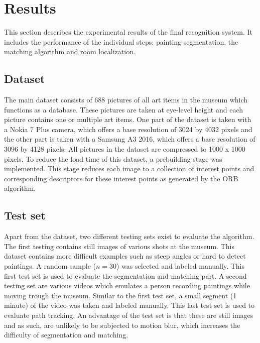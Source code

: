\section{Results}
\label{sec:results}
This section describes the experimental results of the final recognition system. It includes the performance of the individual steps: painting segmentation, the matching algorithm and room localization. 


\subsection{Dataset}
The main dataset consists of 688 pictures of all art items in the museum which functions as a database. These pictures are taken at eye-level height and each picture contains one or multiple art items. One part of the dataset is taken with a Nokia 7 Plus camera, which offers a base resolution of 3024 by 4032 pixels and the other part is taken with a Samsung A3 2016, which offers a base resolution of 3096 by 4128 pixels. All pictures in the dataset are compressed to 1000 x 1000 pixels. To reduce the load time of this dataset, a prebuilding stage was implemented. This stage reduces each image to a collection of interest points and corresponding descriptors for these interest points as generated by the ORB \cite{Rublee2011} algorithm. 

\subsection{Test set}
Apart from the dataset, two different testing sets exist to evaluate the algorithm. The first testing contains still images of various shots at the museum. This dataset contains more difficult examples such as steep angles or hard to detect paintings. A random sample ($n = 30$) was selected and labeled manually. This first test set is used to evaluate the segmentation and matching part. A second testing set are various videos which emulates a person recording paintings while moving trough the museum. Similar to the first test set, a small segment (1 minute) of the video was taken and labeled manually. This last test set is used to evaluate path tracking. An advantage of the test set is that these are still images and as such, are unlikely to be subjected to motion blur, which increases the difficulty of segmentation and matching.

